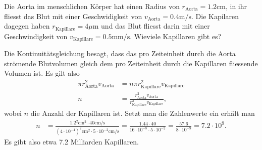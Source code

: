 Die Aorta im menschlichen Körper hat einen Radius von
$r_{\text{Aorta}}=1.2\text{cm}$, in ihr fliesst das Blut mit einer
Geschwidigkeit von $v_{\text{Aorta}}=0.4\text{m/s}$.
Die Kapilaren dagegen haben $r_{\text{Kapillare}}=4\mu\text{m}$
und das Blut fliesst darin
mit einer Geschwindigkeit von $v_{\text{Kapillare}}=0.5\text{mm/s}$.
Wieviele Kapillaren gibt es?

\begin{loesung}
Die Kontinuitätsgleichung besagt, dass das pro Zeiteinheit durch
die Aorta strömende Blutvolumen gleich dem pro Zeiteinheit durch
die Kapillaren fliessende Volumen ist.
Es gilt also
\begin{align*}
\pi r_{\text{Aorta}}^2 v_{\text{Aorta}} 
&=
n\pi r_{\text{Kapillare}}^2 v_{\text{Kapillare}}
\\
n
&=
\frac{r_{\text{Aorta}}^2 v_{\text{Aorta}}}%
{r_{\text{Kapillare}}^2 v_{\text{Kapillare}}},
\end{align*}
wobei $n$ die Anzahl der Kapillaren ist.
Setzt man die Zahlenwerte ein erhält man
\begin{align*}
n
&=
\frac{
1.2^2\text{cm}^2\cdot 40\text{cm/s}
}{
(4\cdot 10^{-4})^2\text{cm}^2\cdot 5\cdot 10^{-2}\text{cm/s}
}
=
\frac{1.44\cdot 40}{16\cdot 10^{-8}\cdot 5\cdot 10^{-2}}
=
\frac{57.6}{8\cdot 10^{-9}}
=
7.2\cdot 10^{9}.
\end{align*}
Es gibt also etwa 7.2 Milliarden Kapillaren.
\end{loesung}

